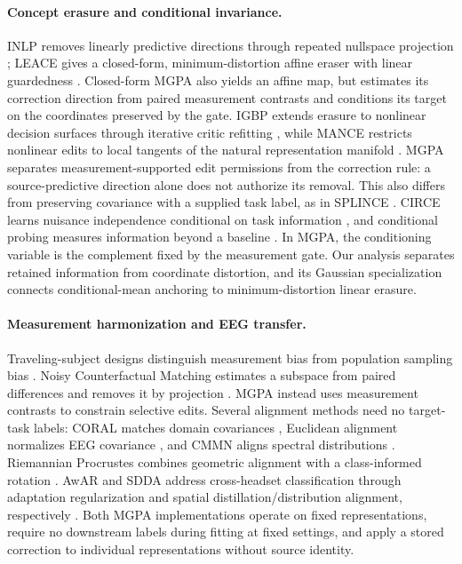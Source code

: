 \documentclass{article}
\theoremstyle{plain}
\theoremstyle{definition}
\begin{document}
\paragraph{Concept erasure and conditional invariance.}
INLP removes linearly predictive directions through repeated nullspace
projection \citep{ravfogel2020}; LEACE gives a closed-form, minimum-distortion
affine eraser with linear guardedness \citep{belrose2023}.
Closed-form MGPA also yields an affine map, but estimates its correction
direction from paired measurement contrasts and conditions its target on the
coordinates preserved by the gate. IGBP extends
erasure to nonlinear decision surfaces through iterative critic refitting
\citep{iskander2023}, while MANCE restricts nonlinear edits to local tangents
of the natural representation manifold \citep{avitan2026mance}.
MGPA separates measurement-supported edit permissions from the correction
rule: a source-predictive direction alone does not authorize its removal.
This also differs from preserving covariance with a supplied task
label, as in SPLINCE \citep{holstege2025splince}. CIRCE learns nuisance
independence conditional on task information \citep{pogodin2023circe},
and conditional probing measures information beyond a baseline
\citep{hewitt2021conditional}. In MGPA, the conditioning variable is the
complement fixed by the measurement gate. Our analysis separates retained
information from coordinate distortion, and its Gaussian specialization
connects conditional-mean anchoring to minimum-distortion linear erasure.

\paragraph{Measurement harmonization and EEG transfer.}
Traveling-subject designs distinguish measurement bias from population
sampling bias \citep{yamashita2019}. Noisy Counterfactual Matching estimates
a subspace from paired differences and removes it by projection
\citep{bai2025ncm}. MGPA instead uses measurement contrasts to constrain
selective edits. Several alignment methods need no target-task labels: CORAL
matches domain covariances \citep{sun2016coral}, Euclidean alignment
normalizes EEG covariance \citep{he2020ea}, and CMMN aligns spectral
distributions \citep{gnassounou2023}. Riemannian Procrustes combines
geometric alignment with a class-informed rotation
\citep{rodrigues2019rpa}. AwAR and SDDA address cross-headset classification
through adaptation regularization and spatial distillation/distribution
alignment, respectively \citep{wu2016awar,liu2026sdda}.
Both MGPA implementations operate on fixed representations, require no
downstream labels during fitting at fixed settings, and apply a stored
correction to individual representations without source identity.
\end{document}
